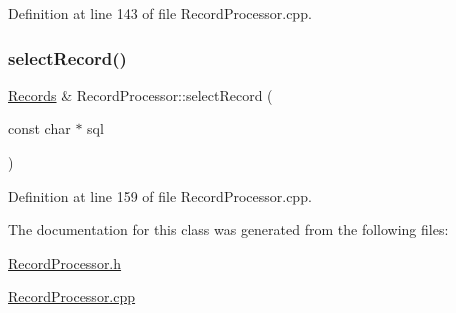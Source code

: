 Definition at line 143 of file Record\+Processor.\+cpp.

\mbox{\label{class_record_processor_aa246f2377aaba5ade7524813f07eaec0}} 
\subsubsection{\texorpdfstring{select\+Record()}{selectRecord()}}
{\footnotesize\ttfamily \mbox{\hyperlink{_record_processor_8h_a38f4f71143d55126a9f66fd1f9824999}{Records}} \& Record\+Processor\+::select\+Record (\begin{DoxyParamCaption}\item[{const char $\ast$}]{sql }\end{DoxyParamCaption})}



Definition at line 159 of file Record\+Processor.\+cpp.



The documentation for this class was generated from the following files\+:\begin{DoxyCompactItemize}
\item 
\mbox{\hyperlink{_record_processor_8h}{Record\+Processor.\+h}}\item 
\mbox{\hyperlink{_record_processor_8cpp}{Record\+Processor.\+cpp}}\end{DoxyCompactItemize}
